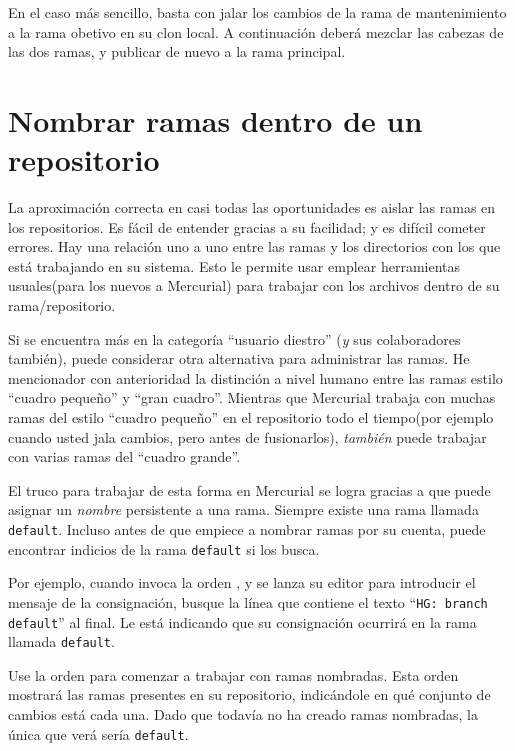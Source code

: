 En el caso más sencillo, basta con jalar los cambios de la rama de
mantenimiento a la rama obetivo en su clon local.
A continuación deberá mezclar las cabezas de las dos ramas, y publicar
de nuevo a la rama principal.

\section{Nombrar ramas dentro de un repositorio}

La aproximación correcta en casi todas las oportunidades es aislar las
ramas en los repositorios.  Es fácil de entender gracias a su
facilidad; y es difícil cometer errores. Hay una relación uno a uno
entre las ramas y los directorios con los que está trabajando en su
sistema. Esto le permite usar emplear herramientas usuales(para los
nuevos a Mercurial) para trabajar con los archivos dentro de su
rama/repositorio.

Si se encuentra más en la categoría ``usuario diestro'' (\emph{y} sus
colaboradores también), puede considerar otra alternativa para
administrar las ramas. He mencionador con anterioridad la distinción a
nivel humano entre las ramas estilo ``cuadro pequeño'' y ``gran
cuadro''.  Mientras que Mercurial trabaja con muchas ramas del estilo
``cuadro pequeño'' en el repositorio todo el tiempo(por ejemplo cuando
usted jala cambios, pero antes de fusionarlos), \emph{también} puede
trabajar con varias ramas del ``cuadro grande''.

El truco para trabajar de esta forma en Mercurial se logra gracias a
que puede asignar un \emph{nombre} persistente a una rama.  Siempre
existe una rama llamada \texttt{default}.  Incluso antes de que
empiece a nombrar ramas por su cuenta, puede encontrar indicios de la
rama \texttt{default} si los busca.

Por ejemplo, cuando invoca la orden , y se lanza su
editor para introducir el mensaje de la consignación, busque la línea
que contiene el texto ``\texttt{HG: branch default}'' al final. Le
está indicando que su consignación ocurrirá en la rama llamada 
\texttt{default}.

Use la orden  para comenzar a trabajar con ramas
nombradas. Esta orden mostrará las ramas presentes en su repositorio,
indicándole en qué conjunto de cambios está cada una.
Dado que todavía no ha creado ramas nombradas, la única que verá sería
\texttt{default}.

